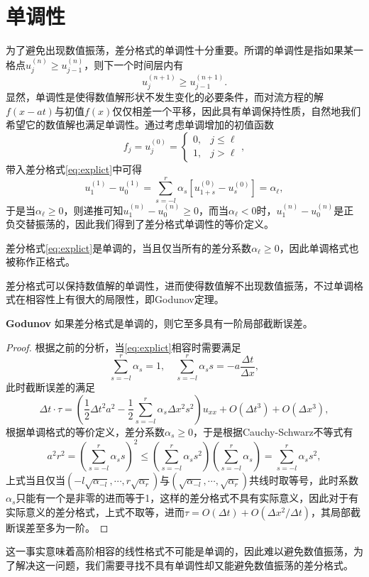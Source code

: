 \documentclass[a4paper,10pt]{ctexart}
\begin{document}
\section{单调性}
为了避免出现数值振荡，差分格式的单调性十分重要。所谓的单调性是指如果某一格点$ u^{(n)}_j\geqslant u^{(n)}_{j-1} $，则下一个时间层内有
\[
    u^{(n+1)}_j\geqslant u^{(n+1)}_{j-1}.
\]
显然，单调性是使得数值解形状不发生变化的必要条件，而对流方程的解$ f(x-at) $与初值$ f(x) $仅仅相差一个平移，因此具有单调保持性质，自然地我们希望它的数值解也满足单调性。通过考虑单调增加的初值函数
\[
    f_j = u^{(0)}_j = 
    \begin{cases}
        0, &j\leqslant \ell\\
        1, &j>\ell
    \end{cases},
\]
带入差分格式\eqref{eq:explict}中可得
\[
    u^{(1)}_1 - u^{(1)}_0 = \sum_{s=-l}^r \alpha_s [u^{(0)}_{1+s} - u^{(0)}_s] = \alpha_\ell,
\]
于是当$ \alpha_\ell\geqslant 0 $，则递推可知$ u^{(n)}_1 - u^{(n)}_0\geqslant 0 $，而当$ \alpha_\ell<0 $时，$ u^{(n)}_1 - u^{(n)}_0 $是正负交替振荡的，因此我们得到了差分格式单调性的等价定义。
\begin{definition}
    差分格式\eqref{eq:explict}是单调的，当且仅当所有的差分系数$ \alpha_\ell\geqslant 0 $，因此单调格式也被称作正格式。
\end{definition}
差分格式可以保持数值解的单调性，进而使得数值解不出现数值振荡，不过单调格式在相容性上有很大的局限性，即Godunov定理。
\begin{theorem}{\normalfont\bf{Godunov}}
    如果差分格式是单调的，则它至多具有一阶局部截断误差。
\end{theorem}
\begin{proof}
    根据之前的分析，当\eqref{eq:explict}相容时需要满足
    \[
        \sum_{s=-l}^r \alpha_s = 1, \quad \sum_{s=-l}^r \alpha_s s = -a \frac{\Delta t}{\Delta x},
    \]
    此时截断误差的满足
    \[
        \Delta t \cdot \tau = (\frac{1}{2}\Delta t^2 a^2 - \frac{1}{2}\sum_{s=-l}^r \alpha_s \Delta x^2 s^2)u_{xx} + O(\Delta t^3) + O(\Delta x^3),
    \]
    根据单调格式的等价定义，差分系数$ \alpha_s \geqslant 0 $，于是根据Cauchy-Schwarz不等式有
    \[
        a^2 r^2 = (\sum_{s=-l}^r \alpha_s s)^2 \leqslant (\sum_{s=-l}^r \alpha_s s^2)(\sum_{s=-l}^r \alpha_s) = \sum_{s=-l}^r \alpha_s s^2,
    \]
    上式当且仅当$ (-l\sqrt{\alpha_{-l}},\cdots ,r \sqrt{\alpha_r}) $与$ (\sqrt{\alpha_{-l}},\cdots ,\sqrt{\alpha_r}) $共线时取等号，此时系数$ \alpha_s $只能有一个是非零的进而等于1，这样的差分格式不具有实际意义，因此对于有实际意义的差分格式，上式不取等，进而$ \tau = O(\Delta t) + O(\Delta x^2 / \Delta t) $，其局部截断误差至多为一阶。
\end{proof}
这一事实意味着高阶相容的线性格式不可能是单调的，因此难以避免数值振荡，为了解决这一问题，我们需要寻找不具有单调性却又能避免数值振荡的差分格式。
\end{document}
